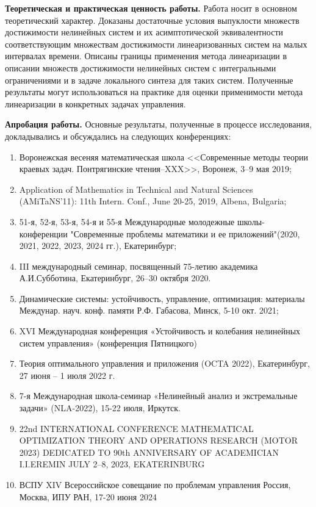 \documentclass[../main.tex]{subfiles}
\begin{document}
\textbf{Теоретическая и практическая ценность работы.} Работа носит в основном теоретический характер. Доказаны достаточные условия выпуклости множеств достижимости нелинейных систем и их асимптотической эквивалентности соответствующим множествам достижимости линеаризованных систем на малых интервалах времени. Описаны границы применения метода линеаризации в описании множеств достижимости нелинейных систем с интегральными ограничениями и в задаче локального синтеза для таких систем. Полученные результаты могут использоваться на практике для оценки применимости метода линеаризации в конкретных задачах управления.
	
\textbf{Апробация работы.}  Основные результаты, полученные в процессе исследования, докладывались и обсуждались на следующих конференциях:
\begin{enumerate}
	\item Воронежская весеняя математическая школа <<Современные методы теории краевых задач. Понтрягинские чтения–XXX>>, Воронеж, 3–9 мая 2019;
	\item Application of Mathematics in Technical and Natural Sciences (AMiTaNS’11): 11th Intern. Conf., June 20-25, 2019, Albena, Bulgaria;
	\item 51-я, 52-я, 53-я, 54-я и 55-я Международные молодежные школы-конференции "Современные проблемы математики и ее приложений"(2020, 2021, 2022, 2023, 2024 гг.), Екатеринбург;
	\item III международный семинар, посвященный 75-летию академика А.И.Субботина, Екатеринбург, 26–30 октября 2020.
	\item Динамические системы: устойчивость, управление, оптимизация: материалы Междунар. науч. конф. памяти Р.Ф. Габасова, Минск, 5-10 окт. 2021;
	\item XVI Международная конференция «Устойчивость и колебания нелинейных систем управления» (конференция Пятницкого) 
	\item Теория оптимального управления и приложения (OCTA 2022),
Екатеринбург, 27 июня – 1 июля 2022 г.
	\item 7-я Международная школа-семинар  «Нелинейный анализ и экстремальные задачи» (NLA-2022), 15-22 июля, Иркутск.
	\item 22nd INTERNATIONAL CONFERENCE MATHEMATICAL OPTIMIZATION THEORY AND OPERATIONS RESEARCH
	(MOTOR 2023) DEDICATED TO 90th ANNIVERSARY OF ACADEMICIAN I.I.EREMIN JULY 2–8, 2023, EKATERINBURG
	\item ВСПУ  XIV Всероссийское совещание по проблемам управления Россия, Москва, ИПУ РАН, 17-20 июня 2024
\end{enumerate}
\end{document}
